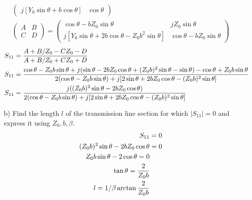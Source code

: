 \documentclass[12pt, letterpaper]{article}
\begin{document}
\begin{itemize}
\begin{align}
\begin{pmatrix}
      j[Y_0\sin\theta+b\cos\theta] & \cos\theta
    \end{pmatrix}
    \\
    \begin{pmatrix}
      A & B\\
      C & D
    \end{pmatrix}
    =
    \begin{pmatrix}
      \cos\theta - bZ_0\sin\theta& jZ_0\sin\theta\\
      j[Y_0\sin\theta+2b\cos\theta-Z_0b^2\sin\theta] & \cos\theta-bZ_0\sin\theta
    \end{pmatrix}
  \end{align}
  \begin{align}
    S_{11}&={A+B/Z_0-CZ_0-D\over A+B/Z_0+CZ_0+D}\\
    S_{11}&={
      \cos\theta-Z_0b\sin\theta+j(\sin\theta-2bZ_0\cos\theta+(Z_0b)^2\sin\theta-\sin\theta)-\cos\theta+Z_0b\sin\theta
      \over
      2(\cos\theta-Z_0b\sin\theta)+j[2\sin\theta+2bZ_0\cos\theta-(Z_0b)^2\sin\theta]
    }
    \\
    S_{11}&={
      j((Z_0b)^2\sin\theta-2bZ_0\cos\theta)
      \over
      2(\cos\theta-Z_0b\sin\theta)+j[2\sin\theta+2bZ_0\cos\theta-(Z_0b)^2\sin\theta]
    }
  \end{align}
  \item [b)] Find the length $l$ of the transmission line section for which $|S_{11}|=0$ and express it using $Z_0, b, \beta$.
  \begin{align}
    S_{11}&=0\\
    (Z_0b)^2\sin\theta-2bZ_0\cos\theta&=0\\
    Z_0b\sin\theta-2\cos\theta=0\\
    \tan\theta={2\over Z_0b}\\
    l=1/\beta \arctan {2\over Z_0b}
  \end{align}
\end{itemize}
\end{document}
